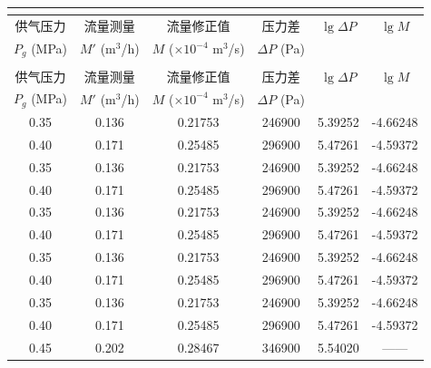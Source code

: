 \documentclass[a4paper, twoside, openany]{NCEPUDoctor}
\begin{document}
  \begin{longtable}{C{0.15} C{0.15} C{0.25} C{0.15} C{0.15} C{0.15}}
  \label{tab:permeability} \\ %

  \toprule[1.5pt]
  供气压力 & 流量测量 & 流量修正值 & 压力差 & $\lg \Delta P$ & $\lg M$ \\
  $P_g$ (MPa) & $M'$ (m$^3$/h) & $M$ ($\times10^{-4}$ m$^3$/s) & $\Delta P$ (Pa) & & \\  %
  \midrule[1pt]
  \endfirsthead

   \\ %
  \toprule[1.5pt]
  供气压力 & 流量测量 & 流量修正值 & 压力差 & $\lg \Delta P$ & $\lg M$ \\
  $P_g$ (MPa) & $M'$ (m$^3$/h) & $M$ ($\times10^{-4}$ m$^3$/s) & $\Delta P$ (Pa) & & \\ %
  \midrule[1pt]
  \endhead

  \bottomrule[1.5pt]
  \endfoot

  0.35 & 0.136 & 0.21753 & 246900 & 5.39252 & -4.66248 \\
  0.40 & 0.171 & 0.25485 & 296900 & 5.47261 & -4.59372 \\
  0.35 & 0.136 & 0.21753 & 246900 & 5.39252 & -4.66248 \\
  0.40 & 0.171 & 0.25485 & 296900 & 5.47261 & -4.59372 \\
  0.35 & 0.136 & 0.21753 & 246900 & 5.39252 & -4.66248 \\
  0.40 & 0.171 & 0.25485 & 296900 & 5.47261 & -4.59372 \\
  0.35 & 0.136 & 0.21753 & 246900 & 5.39252 & -4.66248 \\
  0.40 & 0.171 & 0.25485 & 296900 & 5.47261 & -4.59372 \\
  0.35 & 0.136 & 0.21753 & 246900 & 5.39252 & -4.66248 \\
  0.40 & 0.171 & 0.25485 & 296900 & 5.47261 & -4.59372 \\
  0.45 & 0.202 & 0.28467 & 346900 & 5.54020 & ——
  \end{longtable}
  \clearpage
\end{document}
